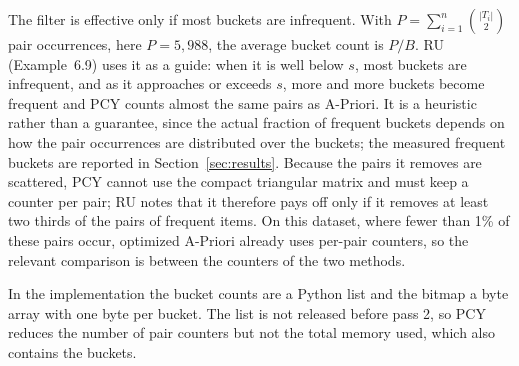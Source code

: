 The filter is effective only if most buckets are infrequent. With $P = \sum_{i=1}^{n} \binom{|T_i|}{2}$ pair occurrences, here $P = 5{,}988$, the average bucket count is $P / B$. RU (Example~6.9) uses it as a guide: when it is well below $s$, most buckets are infrequent, and as it approaches or exceeds $s$, more and more buckets become frequent and PCY counts almost the same pairs as A-Priori. It is a heuristic rather than a guarantee, since the actual fraction of frequent buckets depends on how the pair occurrences are distributed over the buckets; the measured frequent buckets are reported in Section~\ref{sec:results}. Because the pairs it removes are scattered, PCY cannot use the compact triangular matrix and must keep a counter per pair; RU notes that it therefore pays off only if it removes at least two thirds of the pairs of frequent items. On this dataset, where fewer than 1\% of these pairs occur, optimized A-Priori already uses per-pair counters, so the relevant comparison is between the counters of the two methods.

In the implementation the bucket counts are a Python list and the bitmap a byte array with one byte per bucket. The list is not released before pass 2, so PCY reduces the number of pair counters but not the total memory used, which also contains the buckets.
